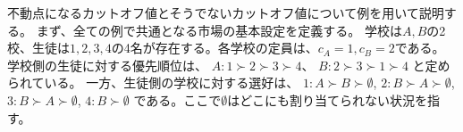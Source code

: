 \documentclass[12pt, a4paper]{article}
\theoremstyle{definition}
\theoremstyle{remark}
\theoremstyle{plain}
\begin{document}






不動点になるカットオフ値とそうでないカットオフ値について例を用いて説明する。
まず、全ての例で共通となる市場の基本設定を定義する。
学校は$A, B$の2校、生徒は$1, 2, 3, 4$の4名が存在する。各学校の定員は、$c_A=1, c_B=2$である。
学校側の生徒に対する優先順位は、
$A: 1 \succ 2 \succ 3 \succ 4$、
$B: 2 \succ 3 \succ 1 \succ 4$
と定められている。
一方、生徒側の学校に対する選好は、
$1: A \succ B \succ \emptyset$, 
$2: B \succ A \succ \emptyset$, 
$3: B \succ A \succ \emptyset$, 
$4: B \succ \emptyset$
である。ここで$\emptyset$はどこにも割り当てられない状況を指す。
\end{document}
